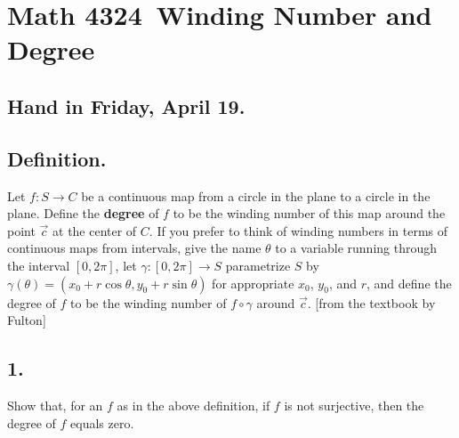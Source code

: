 \documentclass{amsart}
\theoremstyle{plain}
\theoremstyle{definition}
\theoremstyle{remark}
\begin{document}
\section*{Math 4324\  Winding Number and Degree } 

\subsection*{Hand in Friday, April 19.} 

\vspace{.15in}
\subsection*{Definition.}  Let $f : S \to C$ be a continuous map from a circle in the plane to a circle in the plane. Define the {\bf degree} of $f$ to be the winding number of this map around the point $\vec{c}$ at the center of $C$. If you prefer to think of winding numbers in terms of continuous maps from intervals, give the name $\theta$ to a variable running through the interval $[0,2\pi ]$, let $\gamma : [0,2\pi ] \to S$ parametrize $S$ by $\gamma (\theta ) = (x_0 + r\cos \theta , y_0 + r\sin \theta )$ for appropriate $x_0$, $y_0$, and $r$, and define the degree of $f$ to be the winding number of $f\circ \gamma$ around $\vec{c}$. [from the textbook by Fulton]

\vspace{.15in}
\noindent
\subsection*{1.}  Show that, for an $f$ as in the above definition, if $f$ is not surjective, then the degree of $f$ equals zero. 
\end{document}

